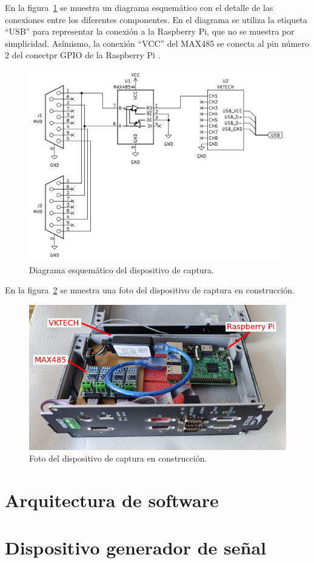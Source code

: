 En la figura~\ref{fig:esquematico} se muestra un diagrama esquemático con el detalle de las conexiones entre los diferentes componentes. En el diagrama se utiliza la etiqueta ``USB'' para representar la conexión a la Raspberry Pi, que no se muestra por simplicidad. Asímismo, la conexión ``VCC'' del MAX485 se conecta al pin número 2 del conectpr GPIO de la Raspberry Pi \cite{gpio}.

\begin{figure}[htbp]
	\centering
	\includegraphics[width=1\textwidth]{./Figures/esquematico.png}
	\caption{Diagrama esquemático del dispositivo de captura.}
    \label{fig:esquematico}
\end{figure}

En la figura~\ref{fig:fotodispositivo} se muestra una foto del dispositivo de captura en construcción.

\begin{figure}[htbp]
	\centering
	\includegraphics[width=1\textwidth]{./Figures/foto-dispositivo.pdf}
	\caption{Foto del dispositivo de captura en construcción.}
    \label{fig:fotodispositivo}
\end{figure}

\section{Arquitectura de software}
\label{sec:software}

\section{Dispositivo generador de señal}
\label{sec:generador}
